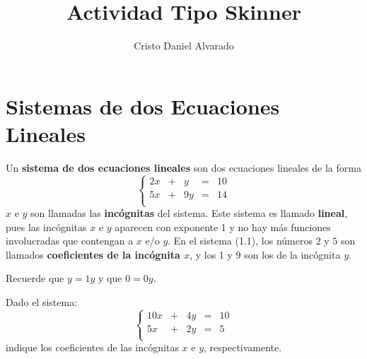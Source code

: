 \documentclass[12pt]{report}
\theoremstyle{largebreak}
\begin{document}
    \setlength{\parskip}{5pt} %
    \setlength{\parindent}{12pt} %
    \title{Actividad Tipo Skinner}
    \author{Cristo Daniel Alvarado}
    \maketitle

    
    \setcounter{chapter}{1}

    \section{Sistemas de dos Ecuaciones Lineales}

    Un \textbf{sistema de dos ecuaciones lineales} son dos ecuaciones lineales de la forma
    \begin{equation}
        \left\{
            \begin{array}{ccccc}
                2x & + & y & = & 10 \\
                5x & + & 9y & = & 14 \\
            \end{array}
        \right.
    \end{equation}
    $x$ e $y$ son llamadas las \textbf{incógnitas} del sistema. Este sistema es llamado \textbf{lineal}, pues las incógnitas $x$ e $y$ aparecen con exponente 1 y no hay más funciones involucradas que contengan a $x$ e/o $y$. En el sistema (1.1), los números $2$ y $5$ son llamados \textbf{coeficientes de la incógnita $x$}, y los 1 y 9 son los de la incógnita $y$.

    \begin{obs}
        Recuerde que $y=1y$ y que $0=0y$.
    \end{obs}

    \begin{excer}
        Dado el sistema:
        \begin{equation*}
            \left\{
                \begin{array}{ccccc}
                    10x & + & 4y & = & 10 \\
                    5x & + & 2y & = & 5 \\
                \end{array}
            \right.
        \end{equation*}
        indique los coeficientes de las incógnitas $x$ e $y$, respectivamente.
    \end{excer}
\end{document}
